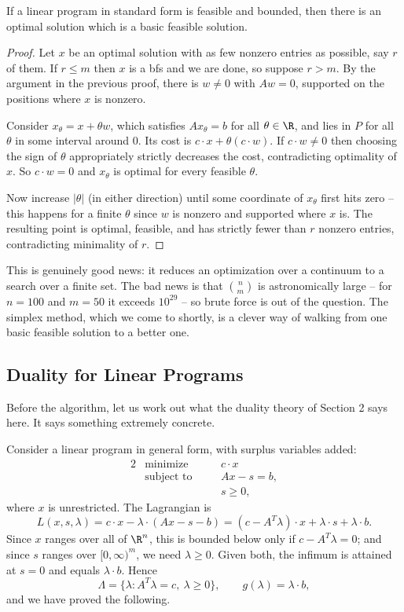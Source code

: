 \documentclass[a4paper]{scrartcl}
\begin{document}
\begin{theorem}
    If a linear program in standard form is feasible and bounded, then there is an optimal solution which is a basic feasible solution.
\end{theorem}
\begin{proof}
    Let $x$ be an optimal solution with as few nonzero entries as possible, say $r$ of them. If $r \leq m$ then $x$ is a bfs and we are done, so suppose $r > m$. By the argument in the previous proof, there is $w \neq 0$ with $Aw = 0$, supported on the positions where $x$ is nonzero.

    Consider $x_\theta = x + \theta w$, which satisfies $Ax_\theta = b$ for all $\theta \in \R$, and lies in $P$ for all $\theta$ in some interval around $0$. Its cost is $c\cdot x + \theta (c\cdot w)$. If $c\cdot w \neq 0$ then choosing the sign of $\theta$ appropriately strictly decreases the cost, contradicting optimality of $x$. So $c\cdot w = 0$ and $x_\theta$ is optimal for every feasible $\theta$.

    Now increase $|\theta|$ (in either direction) until some coordinate of $x_\theta$ first hits zero -- this happens for a finite $\theta$ since $w$ is nonzero and supported where $x$ is. The resulting point is optimal, feasible, and has strictly fewer than $r$ nonzero entries, contradicting minimality of $r$.
\end{proof}

This is genuinely good news: it reduces an optimization over a continuum to a search over a finite set. The bad news is that $\binom{n}{m}$ is astronomically large -- for $n = 100$ and $m = 50$ it exceeds $10^{29}$ -- so brute force is out of the question. The simplex method, which we come to shortly, is a clever way of walking from one basic feasible solution to a better one.

\subsection{Duality for Linear Programs}

Before the algorithm, let us work out what the duality theory of Section 2 says here. It says something extremely concrete.

Consider a linear program in general form, with surplus variables added:
\begin{alignat*}{2}
    & \text{minimize} \quad && c\cdot x \\
    & \text{subject to} \quad && Ax - s = b, \\
    & && s \geq 0,
\end{alignat*}
where $x$ is unrestricted. The Lagrangian is
$$
L(x, s, \lambda) = c\cdot x - \lambda\cdot(Ax - s - b) = (c - A^T\lambda)\cdot x + \lambda\cdot s + \lambda\cdot b.
$$
Since $x$ ranges over all of $\R^n$, this is bounded below only if $c - A^T\lambda = 0$; and since $s$ ranges over $[0,\infty)^m$, we need $\lambda \geq 0$. Given both, the infimum is attained at $s = 0$ and equals $\lambda\cdot b$. Hence
$$
\Lambda = \{\lambda : A^T\lambda = c,\ \lambda \geq 0\}, \qquad g(\lambda) = \lambda\cdot b,
$$
and we have proved the following.
\end{document}
